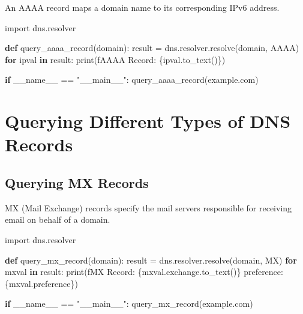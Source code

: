 \documentclass[
  letterpaper,
  DIV=11,
  numbers=noendperiod]{scrreprt}
\newenvironment{Shaded}{\begin{snugshade}}{\end{snugshade}}
\newcommand{\BuiltInTok}[1]{\textcolor[rgb]{0.00,0.23,0.31}{#1}}
\newcommand{\ControlFlowTok}[1]{\textcolor[rgb]{0.00,0.23,0.31}{\textbf{#1}}}
\newcommand{\ImportTok}[1]{\textcolor[rgb]{0.00,0.46,0.62}{#1}}
\newcommand{\KeywordTok}[1]{\textcolor[rgb]{0.00,0.23,0.31}{\textbf{#1}}}
\newcommand{\NormalTok}[1]{\textcolor[rgb]{0.00,0.23,0.31}{#1}}
\newcommand{\OperatorTok}[1]{\textcolor[rgb]{0.37,0.37,0.37}{#1}}
\newcommand{\SpecialCharTok}[1]{\textcolor[rgb]{0.37,0.37,0.37}{#1}}
\newcommand{\SpecialStringTok}[1]{\textcolor[rgb]{0.13,0.47,0.30}{#1}}
\newcommand{\StringTok}[1]{\textcolor[rgb]{0.13,0.47,0.30}{#1}}
\newcommand{\VariableTok}[1]{\textcolor[rgb]{0.07,0.07,0.07}{#1}}
\begin{document}
An AAAA record maps a domain name to its corresponding IPv6 address.

\begin{Shaded}
\begin{Highlighting}[]
\ImportTok{import}\NormalTok{ dns.resolver}

\KeywordTok{def}\NormalTok{ query\_aaaa\_record(domain):}
\NormalTok{    result }\OperatorTok{=}\NormalTok{ dns.resolver.resolve(domain, }\StringTok{\textquotesingle{}AAAA\textquotesingle{}}\NormalTok{)}
    \ControlFlowTok{for}\NormalTok{ ipval }\KeywordTok{in}\NormalTok{ result:}
        \BuiltInTok{print}\NormalTok{(}\SpecialStringTok{f\textquotesingle{}AAAA Record: }\SpecialCharTok{\{}\NormalTok{ipval}\SpecialCharTok{.}\NormalTok{to\_text()}\SpecialCharTok{\}}\SpecialStringTok{\textquotesingle{}}\NormalTok{)}

\ControlFlowTok{if} \VariableTok{\_\_name\_\_} \OperatorTok{==} \StringTok{"\_\_main\_\_"}\NormalTok{:}
\NormalTok{    query\_aaaa\_record(}\StringTok{\textquotesingle{}example.com\textquotesingle{}}\NormalTok{)}
\end{Highlighting}
\end{Shaded}

\section{Querying Different Types of DNS
Records}\label{querying-different-types-of-dns-records}

\subsection{Querying MX Records}\label{querying-mx-records}

MX (Mail Exchange) records specify the mail servers responsible for
receiving email on behalf of a domain.

\begin{Shaded}
\begin{Highlighting}[]
\ImportTok{import}\NormalTok{ dns.resolver}

\KeywordTok{def}\NormalTok{ query\_mx\_record(domain):}
\NormalTok{    result }\OperatorTok{=}\NormalTok{ dns.resolver.resolve(domain, }\StringTok{\textquotesingle{}MX\textquotesingle{}}\NormalTok{)}
    \ControlFlowTok{for}\NormalTok{ mxval }\KeywordTok{in}\NormalTok{ result:}
        \BuiltInTok{print}\NormalTok{(}\SpecialStringTok{f\textquotesingle{}MX Record: }\SpecialCharTok{\{}\NormalTok{mxval}\SpecialCharTok{.}\NormalTok{exchange}\SpecialCharTok{.}\NormalTok{to\_text()}\SpecialCharTok{\}}\SpecialStringTok{ preference: }\SpecialCharTok{\{}\NormalTok{mxval}\SpecialCharTok{.}\NormalTok{preference}\SpecialCharTok{\}}\SpecialStringTok{\textquotesingle{}}\NormalTok{)}

\ControlFlowTok{if} \VariableTok{\_\_name\_\_} \OperatorTok{==} \StringTok{"\_\_main\_\_"}\NormalTok{:}
\NormalTok{    query\_mx\_record(}\StringTok{\textquotesingle{}example.com\textquotesingle{}}\NormalTok{)}
\end{Highlighting}
\end{Shaded}
\end{document}
